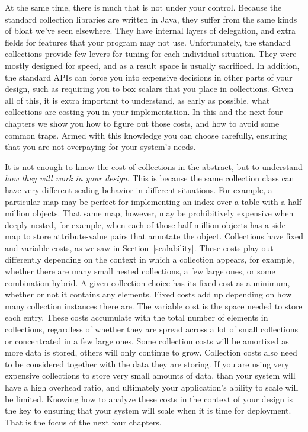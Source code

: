 At the same time, there is much that is not under your control.
Because the standard collection libraries are written in Java, they suffer from
the same kinds of bloat we've seen elsewhere. They have internal layers
of delegation, and extra fields for features that your program may not
use. Unfortunately, the standard collections provide few levers for
tuning for each individual situation. They were
mostly designed for speed, and as a result space is usually sacrificed. In
addition, the standard APIs can force you into expensive decisions in other
parts of your design, such as requiring you to box scalars that you place in
collections. Given all of this, it is extra important to understand, as early as possible,
what collections are costing you in your implementation. In this and
the next four chapters we show you how to figure out those costs, and how
to avoid some common traps. Armed with this
knowledge you can choose carefully, ensuring that you are not
overpaying for your system's needs.

It is not enough to know the cost
of collections in the abstract, but to understand \emph{how they will work in
your design}. This is because the same collection class can have very different
scaling behavior in different situations. For example, a particular map
may be perfect for implementing an index over a table with a half
million objects. That same map, however, may be prohibitively expensive
when deeply nested, for example, when each of those half
million objects has a side map to store attribute-value pairs that annotate the
object.
Collections have fixed and variable costs, as we saw
in Section~\ref{scalability}. These costs play out differently
depending on the context in which a collection appears, for example, whether
there are many small nested collections, a few large ones, or some combination
hybrid.  A given collection choice has its fixed cost as a minimum,
whether or not it contains any elements. Fixed costs add up depending on how many collection instances there are. The variable cost is the space needed to store each entry. 
These costs accumulate with the total number of
elements in collections, regardless of whether they are spread across a lot of
small collections or concentrated in a few
large ones. 
Some collection costs will be amortized as more data is stored, others will only
continue to grow. Collection costs also need to be considered together with the data they are
storing. If you are using very expensive collections to store very small amounts
of data, than your system will have a high overhead ratio, and ultimately your application's ability
to scale will be limited. 
Knowing how to analyze these costs in the context of your design
is the key to ensuring that your system will scale when it is time for
deployment.  That is the focus of the next four chapters.

